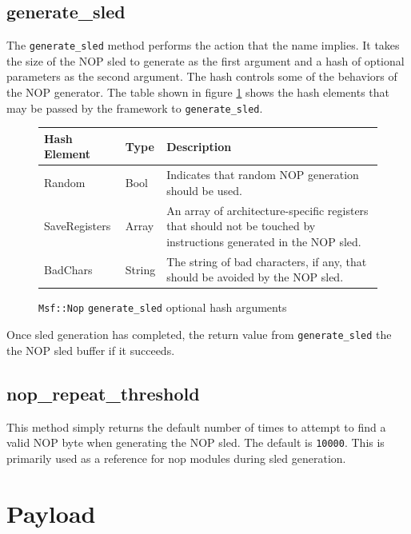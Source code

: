 \documentclass{report}
\begin{document}
        \subsection{generate\_sled}

\par
The \texttt{generate\_sled} method performs the action that the name
implies.  It takes the size of the NOP sled to generate as the first
argument and a hash of optional parameters as the second argument.
The hash controls some of the behaviors of the NOP generator.  The
table shown in figure \ref{fig-table-nop-genhash} shows the hash
elements that may be passed by the framework to
\texttt{generate\_sled}.

\begin{figure}[h]
\begin{center}
\begin{tabular}{|l|l|p{3.0in}|}
\hline
\textbf{Hash Element} & \textbf{Type} & \textbf{Description} \\
\hline
Random & Bool & Indicates that random NOP generation should be used. \\
\hline
SaveRegisters & Array & An array of architecture-specific registers that should not be touched by instructions generated in the NOP sled. \\
\hline
BadChars & String & The string of bad characters, if any, that should be avoided by the NOP sled. \\
\hline
\end{tabular}
\caption{\texttt{Msf::Nop} \texttt{generate\_sled} optional hash
arguments} \label{fig-table-nop-genhash}
\end{center}
\end{figure}

\par
Once sled generation has completed, the return value from
\texttt{generate\_sled} the the NOP sled buffer if it succeeds.

        \subsection{nop\_repeat\_threshold}

\par
This method simply returns the default number of times to attempt to
find a valid NOP byte when generating the NOP sled.  The default is
\texttt{10000}.  This is primarily used as a reference for nop
modules during sled generation.

    \section{Payload}
\end{document}
